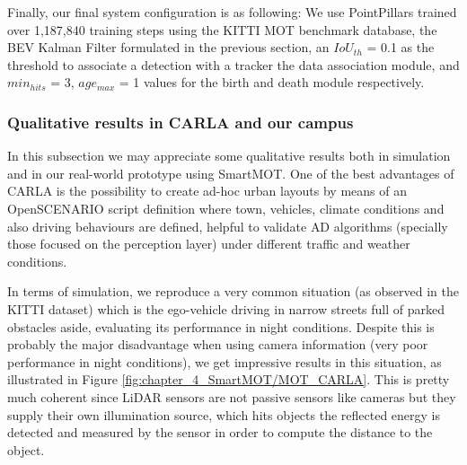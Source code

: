 Finally, our final system configuration is as following: We use PointPillars trained over 1,187,840 training steps using the KITTI MOT benchmark database, the BEV Kalman Filter formulated in the previous section, an $IoU_{th}$ = 0.1 as the threshold to associate a detection with a tracker the data association module, and $min_{hits}$ = 3, $age_{max}$ = 1 values for the birth and death module respectively. 

\subsubsection{Qualitative results in CARLA and our campus}
\label{subsubsubsec:4_mot_quali_carla_campus}

In this subsection we may appreciate some qualitative results both in simulation and in our real-world prototype using SmartMOT. One of the best advantages of CARLA is the possibility to create ad-hoc urban layouts by means of an OpenSCENARIO \cite{jullien2009openscenario} script definition where town, vehicles, climate conditions and also driving behaviours are defined, helpful to validate \ac{AD} algorithms (specially those focused on the perception layer) under different traffic and weather conditions. 

In terms of simulation, we reproduce a very common situation (as observed in the KITTI dataset) which is the ego-vehicle driving in narrow streets full of parked obstacles aside, evaluating its performance in night conditions. Despite this is probably the major disadvantage when using camera information (very poor performance in night conditions), we get impressive results in this situation, as illustrated in Figure \ref{fig:chapter_4_SmartMOT/MOT_CARLA}. This is pretty much coherent since LiDAR sensors are not passive sensors like cameras but they supply their own illumination source, which hits objects the reflected energy is detected and measured by the sensor in order to compute the distance to the object.

